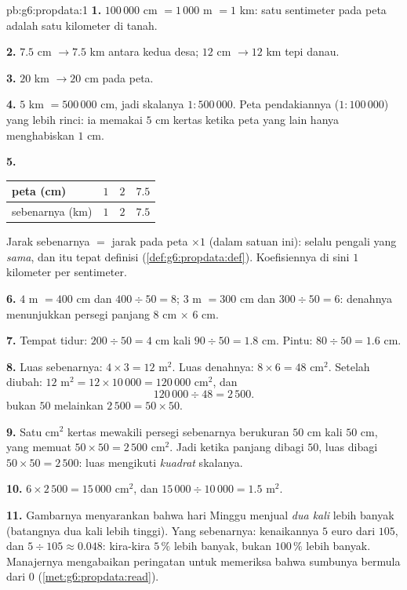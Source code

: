 \begin{solution}{pb:g6:propdata:1}
\textbf{1.} $100\,000$ cm $= 1\,000$ m $= 1$ km: satu sentimeter
pada peta adalah satu kilometer di tanah.

\textbf{2.} $7.5$ cm $\rightarrow 7.5$ km antara kedua desa;
$12$ cm $\rightarrow 12$ km tepi danau.

\textbf{3.} $20$ km $\rightarrow 20$ cm pada peta.

\textbf{4.} $5$ km $= 500\,000$ cm, jadi skalanya
$1:500\,000$. Peta pendakiannya ($1:100\,000$) yang lebih rinci:
ia memakai $5$ cm kertas ketika peta yang lain hanya
menghabiskan $1$ cm.

\textbf{5.}
\begin{center}
\renewcommand{\arraystretch}{1.2}
\begin{tabular}{l|ccc}
peta (cm) & $1$ & $2$ & $7.5$ \\
\hline
sebenarnya (km) & $1$ & $2$ & $7.5$ \\
\end{tabular}
\end{center}
Jarak sebenarnya $=$ jarak pada peta $\times 1$ (dalam satuan ini):
selalu pengali yang \emph{sama}, dan itu tepat definisi
(\cref{def:g6:propdata:def}). Koefisiennya di sini $1$
kilometer per sentimeter.

\textbf{6.} $4$ m $= 400$ cm dan $400 \div 50 = 8$;
$3$ m $= 300$ cm dan $300 \div 50 = 6$: denahnya menunjukkan
persegi panjang $8$ cm $\times$ $6$ cm.

\textbf{7.} Tempat tidur: $200 \div 50 = 4$ cm kali $90 \div 50 = 1.8$ cm.
Pintu: $80 \div 50 = 1.6$ cm.

\textbf{8.} Luas sebenarnya: $4 \times 3 = 12$ m$^2$. Luas denahnya:
$8 \times 6 = 48$ cm$^2$. Setelah diubah:
$12$ m$^2 = 12 \times 10\,000 = 120\,000$ cm$^2$, dan
\[
120\,000 \div 48 = 2\,500 .
\]
 bukan $50$ melainkan $2\,500 = 50 \times 50$.

\textbf{9.} Satu cm$^2$ kertas mewakili persegi sebenarnya berukuran
$50$ cm kali $50$ cm, yang memuat
$50 \times 50 = 2\,500$ cm$^2$. Jadi ketika panjang dibagi
$50$, luas dibagi $50 \times 50 = 2\,500$: luas mengikuti
\emph{kuadrat} skalanya.

\textbf{10.} $6 \times 2\,500 = 15\,000$ cm$^2$, dan
$15\,000 \div 10\,000 = 1.5$ m$^2$.

\textbf{11.} Gambarnya menyarankan bahwa hari Minggu menjual
\emph{dua kali} lebih banyak (batangnya dua kali lebih tinggi). Yang
sebenarnya: kenaikannya $5$ euro dari $105$, dan
$5 \div 105 \approx 0.048$: kira-kira $5\,\%$ lebih banyak, bukan
$100\,\%$ lebih banyak. Manajernya mengabaikan peringatan untuk
memeriksa bahwa sumbunya bermula dari $0$
(\cref{met:g6:propdata:read}).


\end{solution}
